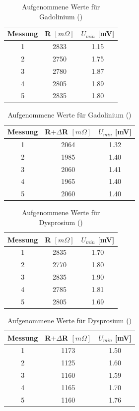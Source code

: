 \begin{table}[htbp]
\begin{tabular}{|c|c|c|}
Messung	& R $[m\Omega]$	&$U_{min}$ [mV]\\ \hline
1&	2833&	1.15\\ \hline
2&	2750&	1.75\\ \hline
3&	2780&	1.87\\ \hline
4&	2805&	1.89\\ \hline
5&	2835&	1.80\\ \hline
\end{tabular}
\begin{tabular}{|c|c|c|}
Messung	& R$+\Delta$R $[m\Omega]$&$U_{min}$ [mV] \\ \hline
1&	2064&	1.32\\ \hline
2&	1985&	1.40\\ \hline
3&	2060&	1.41\\ \hline
4&	1965&	1.40\\ \hline
5&	2060&	1.40\\ \hline
\end{tabular}
\caption{Aufgenommene Werte für Gadolinium ()}
\label{t_werte}
\end{table}

\begin{table}[htbp]
\begin{tabular}{|c|c|c|}
Messung	& R $[m\Omega]$	&$U_{min}$ [mV]\\ \hline
1&	2835&	1.70\\ \hline
2&	2770&	1.80\\ \hline
3&	2835&	1.90\\ \hline
4&	2785&	1.81\\ \hline
5&	2805&	1.69\\ \hline

\end{tabular}
\begin{tabular}{|c|c|c|}
Messung	& R$+\Delta$R $[m\Omega]$&$U_{min}$ [mV] \\ \hline
1&	1173&	1.50\\ \hline
2&	1125&	1.60\\ \hline
3&	1160&	1.59\\ \hline
4&	1165&	1.70\\ \hline
5&	1160&	1.76\\ \hline

\end{tabular}
\caption{Aufgenommene Werte für Dysprosium ()}
\label{t_werte}
\end{table}


